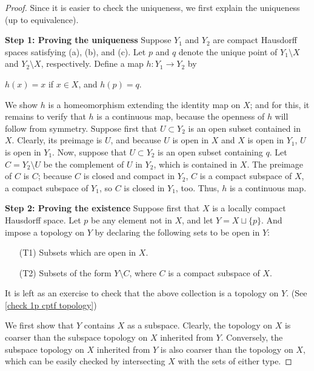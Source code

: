 \begin{proof}
    Since it is easier to check the uniqueness, we first explain the uniqueness (up to equivalence).

    \textbf{Step 1: Proving the uniqueness}\newline\indent
    Suppose $Y_1$ and $Y_2$ are compact Hausdorff spaces satisfying (a), (b), and (c).
    Let $p$ and $q$ denote the unique point of $Y_1\setminus X$ and $Y_2\setminus X$, respectively.
    Define a map $h: Y_1\rightarrow Y_2$ by
    \begin{center}
        $h(x)=x$ if $x\in X$, and $h(p)=q$.
    \end{center}
    We show $h$ is a homeomorphism extending the identity map on $X$; and for this, it remains to verify that $h$ is a continuous map, because the openness of $h$ will follow from symmetry.
    Suppose first that $U\subset Y_2$ is an open subset contained in $X$.
    Clearly, its preimage is $U$, and because $U$ is open in $X$ and $X$ is open in $Y_1$, $U$ is open in $Y_1$.
    Now, suppose that $U\subset Y_2$ is an open subset containing $q$.
    Let $C=Y_2\setminus U$ be the complement of $U$ in $Y_2$, which is contained in $X$.
    The preimage of $C$ is $C$; because $C$ is closed and compact in $Y_2$, $C$ is a compact subspace of $X$, a compact subspace of $Y_1$, so $C$ is closed in $Y_1$, too.
    Thus, $h$ is a continuous map.

    \textbf{Step 2: Proving the existence}\newline\indent
    Suppose first that $X$ is a locally compact Hausdorff space.
    Let $p$ be any element not in $X$, and let $Y=X\sqcup\{p\}$.
    And impose a topology on $Y$ by declaring the following sets to be open in $Y$:
    \begin{enumerate}
        \item[(T1)]
        {
            Subsets which are open in $X$.
        }
        \item[(T2)]
        {
            Subsets of the form $Y\setminus C$, where $C$ is a compact subspace of $X$.
        }
    \end{enumerate}
    It is left as an exercise to check that the above collection is a topology on $Y$. (See \cref{check 1p cptf topology})

    We first show that $Y$ contains $X$ as a subspace.
    Clearly, the topology on $X$ is coarser than the subspace topology on $X$ inherited from $Y$.
    Conversely, the subspace topology on $X$ inherited from $Y$ is also coarser than the topology on $X$, which can be easily checked by intersecting $X$ with the sets of either type.


\end{proof}
